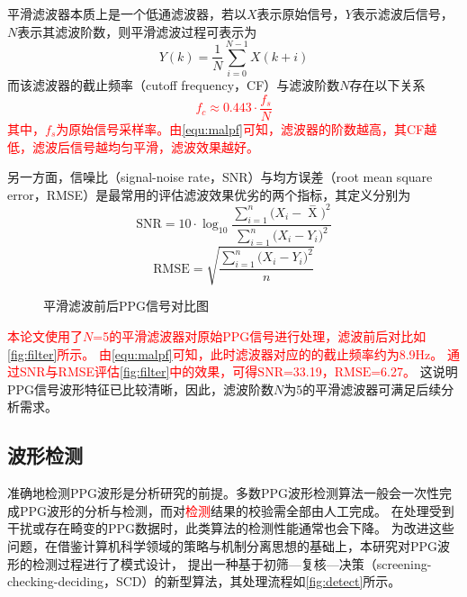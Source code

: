 平滑滤波器本质上是一个低通滤波器，若以$X$表示原始信号，$Y$表示滤波后信号，$N$表示其滤波阶数，则平滑滤波过程可表示为
\begin{equation}
    \label{equ:filter}
    Y(k)=\frac{1}{N}\sum_{i=0}^{N-1}X(k+i)
\end{equation}
而该滤波器的截止频率（cutoff frequency，CF）与滤波阶数$N$存在以下关系\cite{malp2011}
\textcolor{red}{
\begin{equation}
    \label{equ:malpf}
    f_{c} \approx 0.443 \cdot \frac{f_s}{N}    
\end{equation}
其中，$f_s$为原始信号采样率。由\autoref{equ:malpf}可知，滤波器的阶数越高，其CF越低，滤波后信号越均匀平滑，滤波效果越好。}

另一方面，信噪比（signal-noise rate，SNR）与均方误差（root mean square error，RMSE）是最常用的评估滤波效果优劣的两个指标，其定义分别为
\begin{equation}
    \label{equ:snr}
    \text{SNR}=10 \cdot \log_{10}\frac{\sum_{i=1}^{n}{(X_i-\mathop{X} \limits^-})^2}{\sum_{i=1}^{n}{(X_i-Y_i})^2}
\end{equation}
\begin{equation}
    \label{equ:rmse}
    \text{RMSE}=\sqrt{\frac{\sum_{i=1}^{n}{(X_i-Y_i})^2}{n}}
\end{equation}

\begin{figure}[htbp]
    \centering
    \quad
    \caption{\label{fig:filter}平滑滤波前后PPG信号对比图}
\end{figure}

\textcolor{red}{本论文使用了$N$=5的平滑滤波器对原始PPG信号进行处理，滤波前后对比如\autoref{fig:filter}所示。
由\autoref{equ:malpf}可知，此时滤波器对应的的截止频率约为8.9Hz。
通过SNR与RMSE评估\autoref{fig:filter}中的效果，可得$\text{SNR}$=33.19，$\text{RMSE}$=6.27。}
这说明PPG信号波形特征已比较清晰，因此，滤波阶数$N$为5的平滑滤波器可满足后续分析需求。

\subsection{波形检测}
准确地检测PPG波形是分析研究的前提。多数PPG波形检测算法一般会一次性完成PPG波形的分析与检测，而对\textcolor{red}{检测}结果的校验需全部由人工完成\cite{Zhang2010,Chen2021,Allen2007,Feng2018,FengJiang2018}。
在处理受到干扰或存在畸变的PPG数据时，此类算法的检测性能通常也会下降。
为改进这些问题，在借鉴计算机科学领域的策略与机制分离思想的基础上\cite{Levin1975}，本研究对PPG波形的检测过程进行了模式设计，
提出一种基于初筛—复核—决策（screening-checking-deciding，SCD）的新型算法，其处理流程如\autoref{fig:detect}所示。

